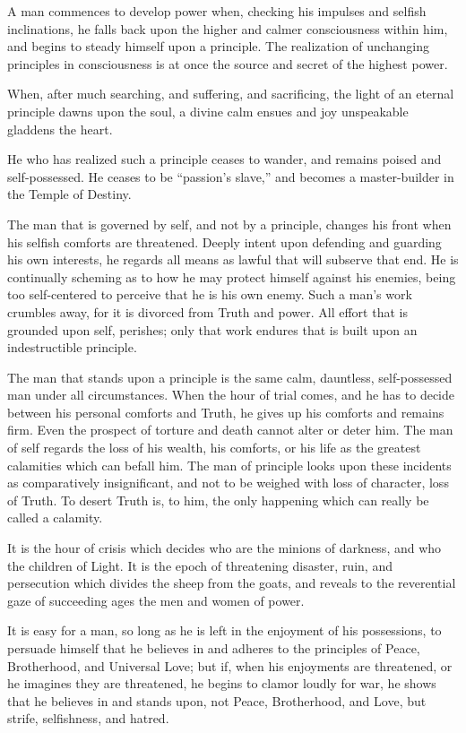 \documentclass[12pt,oneside]{scrbook}
\begin{document}
  A man commences to develop power when, checking his impulses and selfish
  inclinations, he falls back upon the higher and calmer consciousness
  within him, and begins to steady himself upon a principle. The
  realization of unchanging principles in consciousness is at once the
  source and secret of the highest power.
  
  When, after much searching, and suffering, and sacrificing, the light of
  an eternal principle dawns upon the soul, a divine calm ensues and joy
  unspeakable gladdens the heart.
  
  He who has realized such a principle ceases to wander, and remains
  poised and self-possessed. He ceases to be ``passion's slave,'' and
  becomes a master-builder in the Temple of Destiny.
  
  The man that is governed by self, and not by a principle, changes his
  front when his selfish comforts are threatened. Deeply intent upon
  defending and guarding his own interests, he regards all means as lawful
  that will subserve that end. He is continually scheming as to how he may
  protect himself against his enemies, being too self-centered to perceive
  that he is his own enemy. Such a man's work crumbles away, for it is
  divorced from Truth and power. All effort that is grounded upon self,
  perishes; only that work endures that is built upon an indestructible
  principle.
  
  The man that stands upon a principle is the same calm, dauntless,
  self-possessed man under all circumstances. When the hour of trial
  comes, and he has to decide between his personal comforts and Truth, he
  gives up his comforts and remains firm. Even the prospect of torture and
  death cannot alter or deter him. The man of self regards the loss of his
  wealth, his comforts, or his life as the greatest calamities which can
  befall him. The man of principle looks upon these incidents as
  comparatively insignificant, and not to be weighed with loss of
  character, loss of Truth. To desert Truth is, to him, the only happening
  which can really be called a calamity.
  
  It is the hour of crisis which decides who are the minions of darkness,
  and who the children of Light. It is the epoch of threatening disaster,
  ruin, and persecution which divides the sheep from the goats, and
  reveals to the reverential gaze of succeeding ages the men and women of
  power.
  
  It is easy for a man, so long as he is left in the enjoyment of his
  possessions, to persuade himself that he believes in and adheres to the
  principles of Peace, Brotherhood, and Universal Love; but if, when his
  enjoyments are threatened, or he imagines they are threatened, he begins
  to clamor loudly for war, he shows that he believes in and stands upon,
  not Peace, Brotherhood, and Love, but strife, selfishness, and hatred.
  
\end{document}
